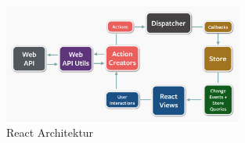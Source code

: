 \begin{figure}[!tbp]
\begin{minipage}[b]{0.8\textwidth}
 	\end{minipage}
 	\hfill
 	\begin{minipage}[b]{0.7\textwidth}
 		\centering
		\includegraphics[width=0.7\textwidth]{images/react}
		\caption{React Architektur \cite{MELD.CH3-web-app.react}}
		\label{fig:reactarch}
 	\end{minipage}
\end{figure}